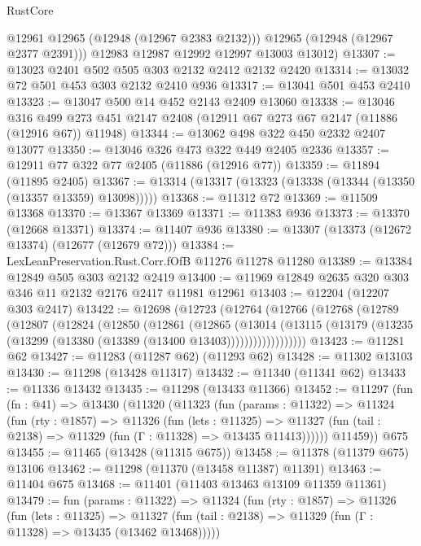 \begin{lexlean}{RustCore}
\begin{coremodule}
          @12961
          @12965
          (@12948 (@12967 @2383 @2132)))
        @12965
        (@12948 (@12967 @2377 @2391)))
      @12983
      @12987
      @12992
      @12997
      @13003
      @13012)
@13307 := @13023 @2401 @502 @505 @303 @2132 @2412 @2132 @2420
@13314 := @13032 @72 @501 @453 @303 @2132 @2410 @936
@13317 := @13041 @501 @453 @2410
@13323 := @13047 @500 @14 @452 @2143 @2409 @13060
@13338 := @13046
    @316
    @499
    @273
    @451
    @2147
    @2408
    (@12911 @67 @273 @67 @2147 (@11886 (@12916 @67)) @11948)
@13344 := @13062 @498 @322 @450 @2332 @2407 @13077
@13350 := @13046 @326 @473 @322 @449 @2405 @2336
@13357 := @12911 @77 @322 @77 @2405 (@11886 (@12916 @77))
@13359 := @11894 (@11895 @2405)
@13367 := @13314 (@13317 (@13323 (@13338 (@13344 (@13350 (@13357 @13359) @13098)))))
@13368 := @11312 @72
@13369 := @11509 @13368
@13370 := @13367 @13369
@13371 := @11383 @936
@13373 := @13370 (@12668 @13371)
@13374 := @11407 @936
@13380 := @13307 (@13373 (@12672 @13374) (@12677 (@12679 @72)))
@13384 := LexLeanPreservation.Rust.Corr.fOfB @11276 @11278 @11280
@13389 := @13384 @12849 @505 @303 @2132 @2419
@13400 := @11969 @12849 @2635 @320 @303 @346 @11 @2132 @2176 @2417 @11981 @12961
@13403 := @12204 (@12207 @303 @2417)
@13422 := @12698
    (@12723
      (@12764
        (@12766
          (@12768
            (@12789
              (@12807
                (@12824
                  (@12850
                    (@12861
                      (@12865
                        (@13014
                          (@13115
                            (@13179 (@13235 (@13299 (@13380 (@13389 (@13400 @13403))))))))))))))))))
@13423 := @11281 @62
@13427 := @11283 (@11287 @62) (@11293 @62)
@13428 := @11302 @13103
@13430 := @11298 (@13428 @11317)
@13432 := @11340 (@11341 @62)
@13433 := @11336 @13432
@13435 := @11298 (@13433 @11366)
@13452 := @11297
    (fun (fn : @41) =>
    @13430
      (@11320
        (@11323
          (fun (params : @11322) =>
          @11324
            (fun (rty : @1857) =>
            @11326
              (fun (lets : @11325) =>
              @11327 (fun (tail : @2138) => @11329 (fun (Γ : @11328) => @13435 @11413))))))
        @11459))
    @675
@13455 := @11465 (@13428 (@11315 @675))
@13458 := @11378 (@11379 @675) @13106
@13462 := @11298 (@11370 (@13458 @11387) @11391)
@13463 := @11404 @675
@13468 := @11401 (@11403 @13463 @13109 @11359 @11361)
@13479 := fun (params : @11322) =>
  @11324
    (fun (rty : @1857) =>
    @11326
      (fun (lets : @11325) =>
      @11327 (fun (tail : @2138) => @11329 (fun (Γ : @11328) => @13435 (@13462 @13468)))))

\end{coremodule}
\end{lexlean}
